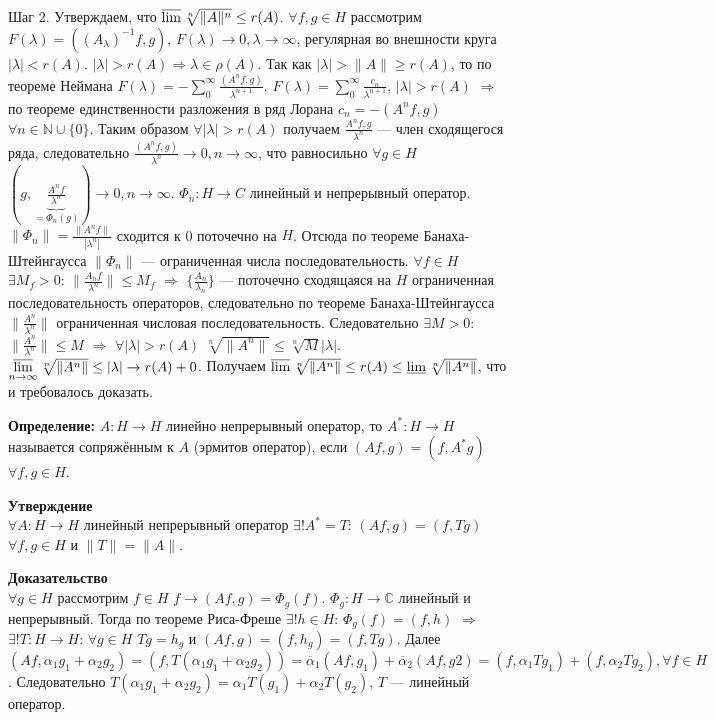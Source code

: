 \documentclass[12pt]{article}
\newcommand{\Al}{A_\lambda}
\newcommand{\Alo}{(\Al)^{-1}}
\begin{document}
Шаг 2.
Утверждаем, что $\varlimsup \sqrt[n]{\|A\|^n} \le r(A)$.
$\forall f, g \in H$ рассмотрим $F(\lambda) = (\Alo f, g)$, $F(\lambda) \to 0, \lambda \to \infty$, регулярная во внешности круга $|\lambda| < r(A)$.
$|\lambda| > r(A) \Rightarrow \lambda \in \rho(A)$. Так как $|\lambda| > \|A\| \ge r(A)$, то по теореме Неймана
$F(\lambda) = - \sum_0^\infty \frac{(A^n f, g)}{\lambda^{n + 1}}$.
$F(\lambda) = \sum_0^\infty \frac{c_n}{\lambda^{n + 1}}$, $|\lambda|>r(A)$ $\Rightarrow$ по теореме единственности разложения в ряд Лорана
$c_n = - (A^n f, g)$ $\forall n \in \mathbb N \cup \{0\}$.
Таким образом $\forall |\lambda| > r(A)$ получаем $\frac{A^n f, g}{\lambda^n}$ --- член сходящегося ряда, следовательно
$\frac{(A^n f, g)}{\lambda^n} \to 0, n \to \infty$, что равносильно $\forall g \in H$ $(g, \underbrace{\frac{A^n f}{\lambda^n}}_{=\Phi_n(g)}) \to 0, n \to \infty$.
$\Phi_n : H \to C$ линейный и непрерывный оператор.
$\|\Phi_n\| = \frac {\|A^n f\|}{|\lambda^n|}$ сходится к 0 поточечно на $H$.
Отсюда по теореме Банаха-Штейнгаусса $\|\Phi_n\|$ --- ограниченная числа последовательность. $\forall f \in H$ $\exists M_f > 0$: $\|\frac{A_n f}{\lambda^n}\|
\le M_f$ $\Rightarrow$ $\{\frac{A_n}{\lambda_n}\}$ --- поточечно сходящаяся на $H$ ограниченная последовательность операторов, следовательно
по теореме Банаха-Штейнгаусса $\|\frac{A^n}{\lambda^n}\|$ ограниченная числовая последовательность.
Следовательно $\exists M>0$: $\|\frac{A^n}{\lambda^n}\| \le M$ $\Rightarrow$ $\forall |\lambda| > r(A)$ $\sqrt[n]{\|A^n\|} \le \sqrt[n]{M}|\lambda|$.
$\varlimsup\limits_{n \to \infty} \sqrt[n]{\|A^n\|} \le |\lambda| \to r(A) + 0$.
Получаем $\varlimsup\sqrt[n]{\|A^n\|} \le r(A) \le \varliminf\sqrt[n]{\|A^n\|}$, что и требовалось доказать.

\textbf{Определение: }$A : H \to H$ линейно непрерывный оператор, то $A^* : H \to H$ называется сопряжённым к $A$ (эрмитов оператор), если $(Af, g) = (f, A^* g)$ $\forall f, g \in H$.

\textbf{Утверждение}\\
$\forall A : H \to H$ линейный непрерывный оператор $\exists! A^* = T$: $(Af, g) = (f, Tg)$ $\forall f, g \in H$ и $\|T\| = \|A\|$.

\textbf{Доказательство}\\
$\forall g \in H$ рассмотрим $f \in H$ $f \to (Af, g) = \Phi_g(f)$.
$\Phi_g : H \to \mathbb C$ линейный и непрерывный.
Тогда по теореме Риса-Фреше $\exists! h \in H$: $\Phi_g(f) = (f, h)$ $\Rightarrow$ $\exists! T : H \to H$: $\forall g \in H$ $Tg = h_g$ и
$(Af, g) = (f, h_g) = (f, Tg)$.
Далее $(Af, \alpha_1 g_1 + \alpha_2 g_2) = (f, T(\alpha_1 g_1 + \alpha_2 g_2)) = \overline{\alpha}_1 (Af, g_1) + \overline{\alpha}_2 (Af, g2) 
= (f, \alpha_1 Tg_1) + (f, \alpha_2 Tg_2), \forall f \in H$.
Следовательно $T(\alpha_1 g_1 + \alpha_2 g_2) = \alpha_1 T(g_1) + \alpha_2 T(g_2)$, $T$ --- линейный оператор.
\end{document}
